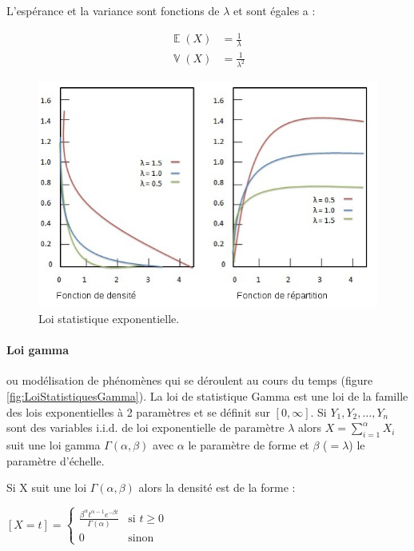 \documentclass[a4paper,12pt]{report}
\DeclareMathOperator{\E}{\mathbb{E}} %
\DeclareMathOperator{\V}{\mathbb{V}} %
\theoremstyle{plain}				%
\theoremstyle{definition}				%
\begin{document}
L’espérance et la variance sont fonctions de $\lambda$ et sont égales a :

\begin{align*}
	\E(X) &= \frac{1}{\lambda} \\
	\V(X) &= \frac{1}{\lambda ^2}
\end{align*} 


\begin{figure}
{\centering
\includegraphics[width=\columnwidth]{loiStatExponentielle.png}
\caption{Loi statistique exponentielle.}
\label{fig:LoiStatistiquesExponentielle}
\par}
\end{figure}

\paragraph{Loi gamma}
ou modélisation de phénomènes qui se déroulent au cours du temps (figure \ref{fig:LoiStatistiquesGamma}). 
La loi de statistique Gamma est une loi de la famille des lois exponentielles à 2 paramètres 
  et se définit sur $[0, \infty]$.
Si $Y_1, Y_2, \ldots, Y_n$ sont des variables i.i.d. 
  de loi exponentielle de paramètre $\lambda$ alors $X=\sum_{ i= 1}^{\alpha} X_i$  
  suit une loi gamma $\Gamma(\alpha, \beta)$ avec 
    $\alpha$ le paramètre de forme et 
    $\beta$ ($=\lambda$) le paramètre d'échelle. 
  
Si X suit une loi $\Gamma(\alpha, \beta)$ alors la densité est de la forme :

  \begin{center}
  $[X=t] = \left\{
    \begin{array}{ll}
    	\frac{\beta^{\alpha} t^{\alpha-1} e^{-\beta t}}{\Gamma(\alpha)}  & 
    	\mbox{si } t \geq 0  \\
        0 & 
        \mbox{sinon}
    \end{array}
	\right.$
  \label{definitionLoiGammaDensite}
  \end{center}
   
\end{document}
